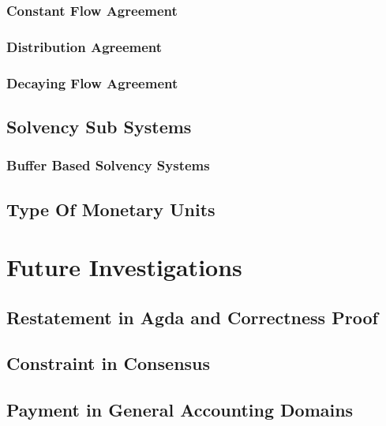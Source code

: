 \documentclass[a4paper,10pt]{report}
\begin{document}
\subsection{Constant Flow Agreement}

\subsection{Distribution Agreement}

\subsection{Decaying Flow Agreement}

\section{Solvency Sub Systems}

\subsection{Buffer Based Solvency Systems}

\section{Type Of Monetary Units}

\chapter{Future Investigations}

\section{Restatement in Agda and Correctness Proof}

\section{Constraint in Consensus}

\section{Payment in General Accounting Domains}

\newpage
\printbibliography{}
\end{document}
